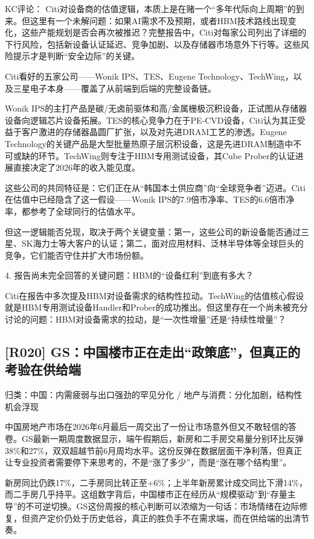 \documentclass[11pt]{ctexart}
\begin{document}
KC评论： Citi对设备商的估值逻辑，本质上是在赌一个“多年代际向上周期”的到来。但这里有一个未解问题：如果AI需求不及预期，或者HBM技术路线出现变化，这些产能规划是否会再次被推迟？完整报告中，Citi对每家公司列出了详细的下行风险，包括新设备认证延迟、竞争加剧、以及存储器市场意外下行等。这些风险提示才是判断“安全边际”的关键。

Citi看好的五家公司——Wonik IPS、TES、Eugene Technology、TechWing，以及三星电子本身——覆盖了从前端到后端的完整设备链。

Wonik IPS的主打产品是碳/无卤前驱体和高/金属栅极沉积设备，正试图从存储器设备向逻辑芯片设备拓展。TES的核心竞争力在于PE-CVD设备，Citi认为其正受益于客户激进的存储器晶圆厂扩张，以及对先进DRAM工艺的渗透。Eugene Technology的关键产品是大型批量热原子层沉积设备，这是先进DRAM制造中不可或缺的环节。TechWing则专注于HBM专用测试设备，其Cube Prober的认证进展直接决定了2026年的收入能见度。

这些公司的共同特征是：它们正在从“韩国本土供应商”向“全球竞争者”迈进。Citi在估值中已经隐含了这一假设——Wonik IPS的7.9倍市净率、TES的6.6倍市净率，都参考了全球同行的估值水平。

但这一逻辑能否兑现，取决于两个关键变量：第一，这些公司的新设备能否通过三星、SK海力士等大客户的认证；第二，面对应用材料、泛林半导体等全球巨头的竞争，它们能否守住并扩大市场份额。

4. 报告尚未完全回答的关键问题：HBM的“设备红利”到底有多大？

Citi在报告中多次提及HBM对设备需求的结构性拉动。TechWing的估值核心假设就是HBM专用测试设备Handler和Prober的成功推出。但这里存在一个尚未被充分讨论的问题：HBM对设备需求的拉动，是“一次性增量”还是“持续性增量”？

\subsection{[R020] GS：中国楼市正在走出“政策底”，但真正的考验在供给端}
{\small\color{refgray}归类：中国：内需疲弱与出口强劲的罕见分化 / 地产与消费：分化加剧，结构性机会浮现}

中国房地产市场在2026年6月最后一周交出了一份让市场意外但又不敢轻信的答卷。GS最新一期周度数据显示，端午假期后，新房和二手房交易量分别环比反弹38\%和27\%，双双超越节前6月周均水平。这份反弹在数据层面干净利落，但真正让专业投资者需要停下来思考的，不是“涨了多少”，而是“涨在哪个结构里”。

新房同比仍跌17\%，二手房同比转正至+6\%；上半年新房累计成交同比下滑14\%，而二手房几乎持平。这组数字背后，中国楼市正在经历从“规模驱动”到“存量主导”的不可逆切换。GS这份周报的核心判断可以浓缩为一句话：市场情绪在边际修复，但资产定价仍处于历史低谷，真正的胜负手不在需求端，而在供给端的出清节奏。
\end{document}
